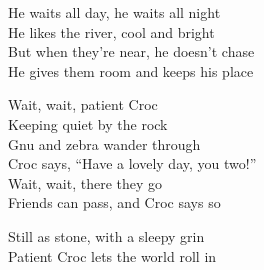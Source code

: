 \begin{lyrics}
He waits all day, he waits all night\\
He likes the river, cool and bright\\
But when they’re near, he doesn’t chase\\
He gives them room and keeps his place

Wait, wait, patient Croc\\
Keeping quiet by the rock\\
Gnu and zebra wander through\\
Croc says, “Have a lovely day, you two!”\\
Wait, wait, there they go\\
Friends can pass, and Croc says so

Still as stone, with a sleepy grin\\
Patient Croc lets the world roll in
\end{lyrics}
